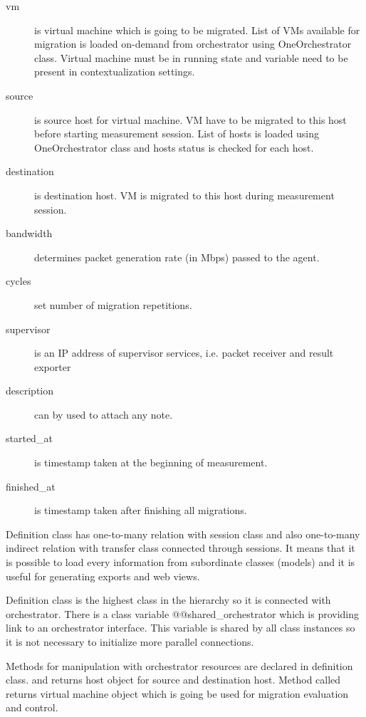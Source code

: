 \begin{description}
	\item[vm] is virtual machine which is going to be migrated. List of \Ac{VM}s available for migration is loaded on-demand from orchestrator using OneOrchestrator class. Virtual machine must be in running state and variable  need to be present in contextualization settings.
	\item[source] is source host for virtual machine. \Ac{VM} have to be migrated to this host before starting measurement session. List of hosts is loaded using OneOrchestrator class and hosts status is checked for each host.
	\item[destination] is destination host. \Ac{VM} is migrated to this host during measurement session.
	\item[bandwidth] determines packet generation rate (in Mbps) passed to the agent.
	\item[cycles] set number of migration repetitions.
	\item[supervisor] is an \Ac{IP} address of supervisor services, i.e. packet receiver and result exporter
	\item[description] can by used to attach any note.

	\item[started\_at] is timestamp taken at the beginning of measurement.
	\item[finished\_at] is timestamp taken after finishing all migrations.
\end{description}

Definition class has one-to-many relation with session class and also one-to-many indirect relation with transfer class connected through sessions. It means that it is possible to load every information from subordinate classes (models) and it is useful for generating exports and web views.

Definition class is the highest class in the hierarchy so it is connected with orchestrator. There is a class variable {@@shared\_orchestrator} which is providing link to an orchestrator interface. This variable is shared by all class instances so it is not necessary to initialize more parallel connections.

Methods for manipulation with orchestrator resources are declared in definition class.  and  returns host object for source and destination host. Method called  returns virtual machine object which is going be used for migration evaluation and control.

